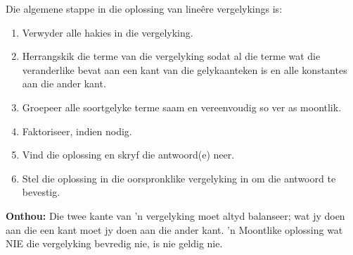 Die algemene stappe in die oplossing van lineêre vergelykings is:
\begin{enumerate}[noitemsep, label=\textbf{\arabic*}. ] 
    \item Verwyder alle hakies in die vergelyking.
    \item Herrangskik die terme van die vergelyking sodat al die terme wat die veranderlike bevat aan een kant van die gelykaanteken is en alle konstantes aan die ander kant.
    \item Groepeer alle soortgelyke terme saam en vereenvoudig so ver as moontlik.
\item Faktoriseer, indien nodig.
    \item Vind die oplossing en skryf die antwoord(e) neer.
    \item Stel die oplossing in die oorspronklike vergelyking in om die antwoord te bevestig.
\end{enumerate}

\textbf{Onthou: } Die twee kante van 'n vergelyking moet altyd balanseer; wat jy doen aan die een kant moet jy doen aan die ander kant. 'n Moontlike oplossing wat NIE die vergelyking bevredig nie, is nie geldig nie.

    
% 
% 	    
% 
% 	    
% 
% 	    
% 

